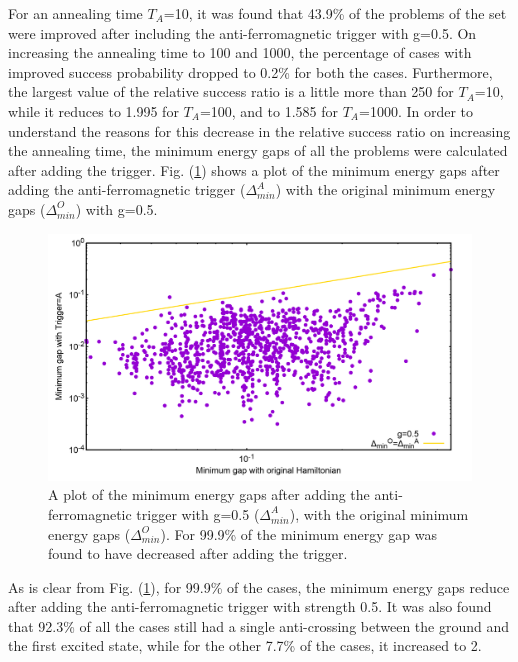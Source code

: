 \documentclass[../main.tex]{subfiles}
\begin{document}
For an annealing time $T_A$=10, it was found that 43.9\% of the problems of the set were improved after including the anti-ferromagnetic trigger with g=0.5. On increasing the annealing time to 100 and 1000, the percentage of cases with improved success probability dropped to 0.2\% for both the cases. Furthermore, the largest value of the relative success ratio is a little more than 250 for $T_A$=10, while it reduces to 1.995 for $T_A$=100, and to 1.585 for $T_A$=1000. In order to understand the reasons for this decrease in the relative success ratio on increasing the annealing time, the minimum energy gaps of all the problems were calculated after adding the trigger. Fig. (\ref{fig:a13}) shows a plot of the minimum energy gaps after adding the anti-ferromagnetic trigger ($\Delta_{min}^A$) with the original minimum energy gaps ($\Delta_{min}^O$) with g=0.5.
\begin{figure}[H]
\centering 
\includegraphics[scale=0.2]{MinGap_A_g0.png}
\caption{A plot of the minimum energy gaps after adding the anti-ferromagnetic trigger with g=0.5 ($\Delta_{min}^A$), with the original minimum energy gaps ($\Delta_{min}^O$). For 99.9\% of the minimum energy gap was found to have decreased after adding the trigger.}
\label{fig:a13}
\end{figure}
As is clear from Fig. (\ref{fig:a13}), for 99.9\% of the cases, the minimum energy gaps reduce after adding the anti-ferromagnetic trigger with strength 0.5. It was also found that 92.3\% of all the cases still had a single anti-crossing between the ground and the first excited state, while for the other 7.7\% of the cases, it increased to 2.
\end{document}
